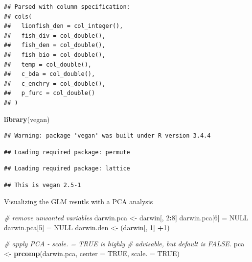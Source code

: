 \documentclass[]{article}
\newenvironment{Shaded}{\begin{snugshade}}{\end{snugshade}}
\newcommand{\KeywordTok}[1]{\textcolor[rgb]{0.13,0.29,0.53}{\textbf{#1}}}
\newcommand{\DataTypeTok}[1]{\textcolor[rgb]{0.13,0.29,0.53}{#1}}
\newcommand{\DecValTok}[1]{\textcolor[rgb]{0.00,0.00,0.81}{#1}}
\newcommand{\StringTok}[1]{\textcolor[rgb]{0.31,0.60,0.02}{#1}}
\newcommand{\CommentTok}[1]{\textcolor[rgb]{0.56,0.35,0.01}{\textit{#1}}}
\newcommand{\OtherTok}[1]{\textcolor[rgb]{0.56,0.35,0.01}{#1}}
\newcommand{\OperatorTok}[1]{\textcolor[rgb]{0.81,0.36,0.00}{\textbf{#1}}}
\newcommand{\NormalTok}[1]{#1}
\begin{document}
\begin{verbatim}
## Parsed with column specification:
## cols(
##   lionfish_den = col_integer(),
##   fish_div = col_double(),
##   fish_den = col_double(),
##   fish_bio = col_double(),
##   temp = col_double(),
##   c_bda = col_double(),
##   c_enchry = col_double(),
##   p_furc = col_double()
## )
\end{verbatim}

\begin{Shaded}
\begin{Highlighting}[]
\KeywordTok{library}\NormalTok{(vegan)}
\end{Highlighting}
\end{Shaded}

\begin{verbatim}
## Warning: package 'vegan' was built under R version 3.4.4
\end{verbatim}

\begin{verbatim}
## Loading required package: permute
\end{verbatim}

\begin{verbatim}
## Loading required package: lattice
\end{verbatim}

\begin{verbatim}
## This is vegan 2.5-1
\end{verbatim}

Visualizing the GLM resutls with a PCA analysis

\begin{Shaded}
\begin{Highlighting}[]
\CommentTok{# remove unwanted variables }
\NormalTok{darwin.pca <-}\StringTok{ }\NormalTok{darwin[, }\DecValTok{2}\OperatorTok{:}\DecValTok{8}\NormalTok{]}
\NormalTok{darwin.pca[}\DecValTok{6}\NormalTok{] =}\StringTok{ }\OtherTok{NULL}
\NormalTok{darwin.pca[}\DecValTok{5}\NormalTok{] =}\StringTok{ }\OtherTok{NULL}
\NormalTok{darwin.den <-}\StringTok{ }\NormalTok{(darwin[, }\DecValTok{1}\NormalTok{] }\OperatorTok{+}\DecValTok{1}\NormalTok{)}
 
\CommentTok{# apply PCA - scale. = TRUE is highly }
\CommentTok{# advisable, but default is FALSE. }
\NormalTok{pca <-}\StringTok{ }\KeywordTok{prcomp}\NormalTok{(darwin.pca,}
                 \DataTypeTok{center =} \OtherTok{TRUE}\NormalTok{,}
                 \DataTypeTok{scale. =} \OtherTok{TRUE}\NormalTok{) }
\end{Highlighting}
\end{Shaded}
\end{document}
